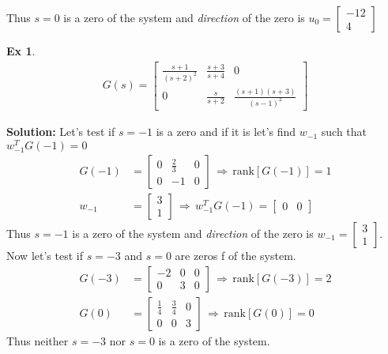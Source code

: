 \documentclass[twoside]{article}
\newtheorem{exmp}[theorem]{Ex}
\begin{document}
%
Thus $s = 0$ is a zero of the system and \textit{direction} of the zero is $u_0 = \begin{bmatrix} -12 \\ 4 \end{bmatrix} $
%
\begin{exmp}
	\begin{align*}
	G(s) = \left[ \begin{array}{ccc} \frac{s+1}{(s+2)^2} & \frac{s+3}{s+4} & 0 \\  
	0 & \frac{s}{s+2} & \frac{(s+1)(s+3)}{(s-1)^2}
        \end{array} \right]
	\end{align*}
\end{exmp}
%
\textbf{Solution:} Let's test if $s = -1$ is a zero and if it is let's find $w_{-1}$ such that $w_{-1}^T G(-1) = 0$
%
\begin{align*}
	G(-1) &= \left[ \begin{array}{ccc} 0 & \frac{2}{3} & 0 \\  
	0 & -1 & 0
        \end{array} \right] \, \Rightarrow \, \mathrm{rank}[G(-1)] = 1
        \\
        w_{-1} &= \begin{bmatrix} 3 \\ 1 \end{bmatrix} \, \Rightarrow \, w_{-1}^T G(-1) = \begin{bmatrix} 0 & 0 \end{bmatrix}
\end{align*}
%
Thus $s = -1$ is a zero of the system and \textit{direction} of the zero is $w_{-1} = \begin{bmatrix} 3 \\ 1 \end{bmatrix} $.
Now let's test if $s = -3$ and $s=0$ are zeros f of the system.
%
\begin{align*}
	G(-3) &= \left[ \begin{array}{ccc} -2 & 0 & 0 \\  
	0 & 3 & 0
        \end{array} \right] \, \Rightarrow \, \mathrm{rank}[G(-3)] = 2
        \\
        G(0) &= \left[ \begin{array}{ccc} \frac{1}{4} & \frac{3}{4} & 0 \\  
	0 & 0 & 3
        \end{array} \right] \, \Rightarrow \, \mathrm{rank}[G(0)] = 0
\end{align*}
%
Thus neither $s=-3$ nor $s=0$ is a zero of the system.
\end{document}
